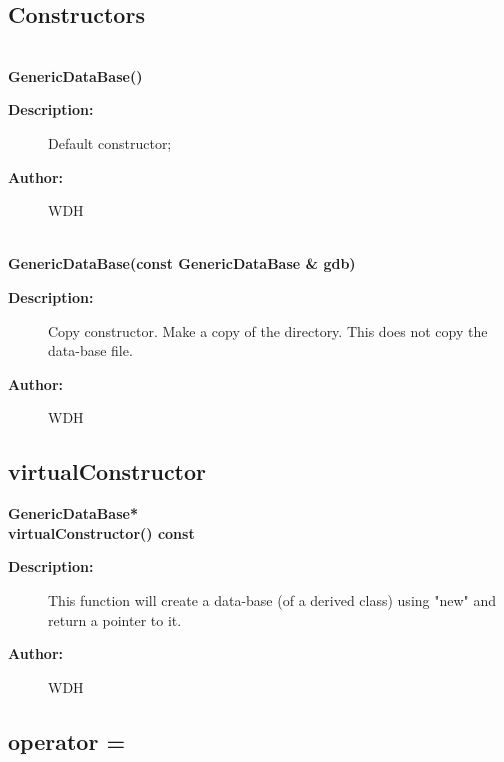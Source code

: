 \subsection{Constructors}
 
\newlength{\GenericDataBaseIncludeArgIndent}
\begin{flushleft} \textbf{%
  \\ 
\settowidth{\GenericDataBaseIncludeArgIndent}{GenericDataBase(}%
GenericDataBase()
}\end{flushleft}
\begin{description}
\item[{\bf Description:}] 
   Default constructor;
\item[{\bf Author:}]  WDH

\end{description}

 
\begin{flushleft} \textbf{%
  \\ 
\settowidth{\GenericDataBaseIncludeArgIndent}{GenericDataBase(}%
GenericDataBase(const GenericDataBase \& gdb)
}\end{flushleft}
\begin{description}
\item[{\bf Description:}] 
   Copy constructor.
   Make a copy of the directory. This does not copy the data-base file.
\item[{\bf Author:}]  WDH

\end{description}
\subsection{virtualConstructor}
 
\begin{flushleft} \textbf{%
GenericDataBase*  \\ 
\settowidth{\GenericDataBaseIncludeArgIndent}{virtualConstructor(}%
virtualConstructor() const
}\end{flushleft}
\begin{description}
\item[{\bf Description:}] 
   This function will create a data-base (of a derived class) using "new" and 
   return a pointer to it.
   
\item[{\bf Author:}]  WDH

\end{description}
\subsection{operator =}
 

